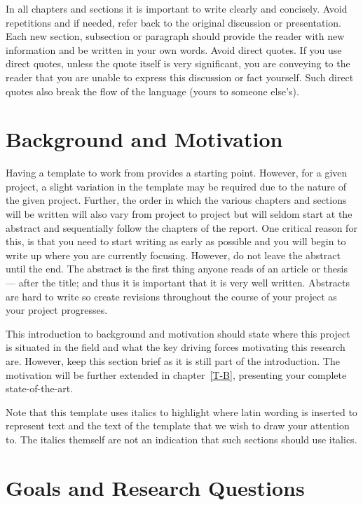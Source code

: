 \documentclass[a4paper]{book}
\begin{document}
In all chapters and sections it is important to write clearly and concisely. Avoid repetitions and if needed, refer back to the original discussion or presentation. Each new section, subsection or paragraph should provide the reader with new information and be written in your own words. Avoid direct quotes. If you use direct quotes, unless the quote itself is very significant, you are conveying to the reader that you are unable to express this discussion or fact yourself. Such direct quotes also break the flow of the language (yours to someone else's).





\section{Background and Motivation}\label{cit}
\label{sec:BackgroundAndMotivation}

Having a template to work from provides a starting point. However, for a given project, a slight variation in the template may be required due to the nature of the given project. Further, the order in which the various chapters and sections will be written will also vary from project to project but will seldom start at the abstract and sequentially follow the chapters of the report. One critical reason for this, is that you need to start writing as early as possible and you will begin to write up where you are currently focusing. However, do not leave the abstract until the end. The abstract is the first thing anyone reads of an article or thesis --- after the title; and thus it is important that it is very well written. Abstracts are hard to write so create revisions throughout the course of your project as your project progresses.

This introduction to background and motivation should state where this project is situated in the field and what the key driving forces motivating this research are. However, keep this section brief as it is still part of the introduction. The motivation will be further extended in chapter~\ref{T-B}, presenting your complete state-of-the-art.

Note that this template uses italics to highlight where latin wording is inserted to represent text and the text of the template that we wish to draw your attention to. The italics themself are not an indication that such sections should use italics.

\section{Goals and Research Questions}
\label{sec:Goals and Research Questions}
\end{document}

